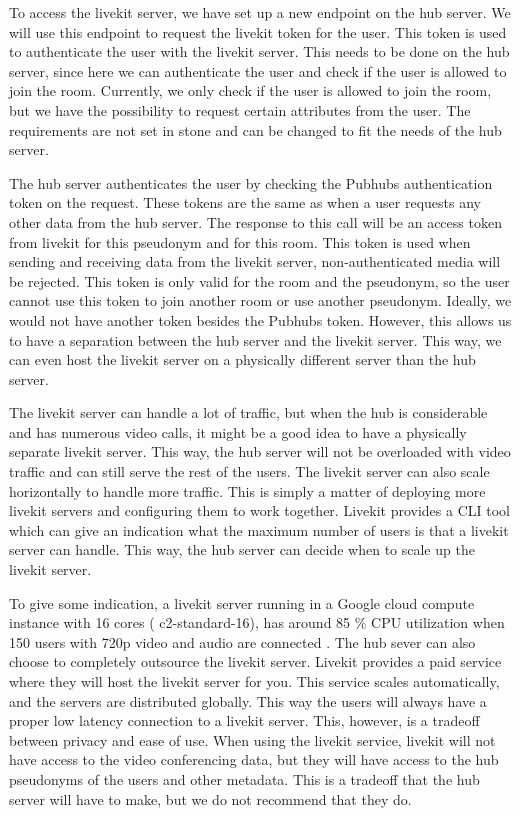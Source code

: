 \documentclass{report}
\begin{document}
To access the livekit server, we have set up a new endpoint on the hub server. We will use this endpoint to request
the livekit token for the user. This token is used to authenticate the user with the livekit server. This needs to
be done on the hub server, since here we can authenticate the user and check if the user is allowed to join the room.
Currently, we only check if the user is allowed to join the room, but we have the possibility to request certain
attributes from the user. The requirements are not set in stone and can be changed to fit the needs of the hub server.

The hub server authenticates the user by checking the Pubhubs authentication token on the request. These tokens are
the same as when a user requests any other data from the hub server. The response to this call will be an
access token from livekit for this pseudonym and for this room. This token is used when sending and receiving data
from the livekit server, non-authenticated media will be rejected. This token is only valid for the room and the
pseudonym, so the user cannot use this token to join another room or use another pseudonym. Ideally, we would not
have another token besides the Pubhubs token. However, this allows us to have a separation between the hub server
and the livekit server. This way, we can even host the livekit server on a physically different server than the hub
server.

The livekit server can handle a lot of traffic, but when the hub is considerable and has numerous video calls, it
might be a good idea to have a physically separate livekit server. This way, the hub server will not be overloaded with
video traffic and can still serve the rest of the users. The livekit server can also scale horizontally to handle
more traffic. This is simply a matter of deploying more livekit servers and configuring them to work together.
Livekit provides a CLI tool which can give an indication what the maximum number of users is that a livekit server
can handle. This way, the hub server can decide when to scale up the livekit server.

To give some indication, a livekit server running in a Google cloud compute instance with 16 cores (
c2-standard-16), has around 85 \% CPU utilization when 150 users with 720p video and audio are connected
\cite{noauthor_benchmarking_nodate}. The hub sever can also choose to completely outsource the livekit server.
Livekit provides a paid service where they will host the livekit server for you. This service scales
automatically, and the servers are distributed globally. This way the users will always have a proper low
latency connection to a livekit server. This, however, is a tradeoff between privacy and ease of use. When using
the livekit service, livekit will not have access to the video conferencing data, but they will have access to
the hub pseudonyms of the users and other metadata. This is a tradeoff that the hub server will have to make,
but we do not recommend that they do.
\end{document}
